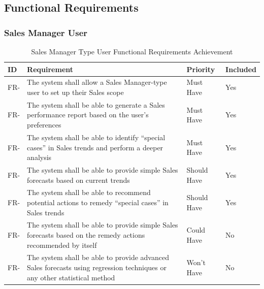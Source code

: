 \documentclass[a4paper]{report}
\begin{document}

\newcommand{\rfrid}{FR-\arabic{ref-frcounter}}
\newcommand{\rnfrid}{NFR-\arabic{ref-nfrcounter}}

\subsection{Functional Requirements}

\subsubsection{Sales Manager User}

\begin{table}[H]
    \centering
    \begin{tabular}{|l|p{8cm}|l|l|}
        \hline
        \textbf{ID} & \textbf{Requirement} & \textbf{Priority} & \textbf{Included} \\
        \hline
        \stepcounter{ref-frcounter}\rfrid & The system shall allow a Sales Manager-type user to set up their Sales scope & Must Have & Yes \\ \hline
        \stepcounter{ref-frcounter}\rfrid & The system shall be able to generate a Sales performance report based on the user’s preferences & Must Have & Yes \\ \hline
        \stepcounter{ref-frcounter}\rfrid & The system shall be able to identify “special cases” in Sales trends and perform a deeper analysis & Must Have & Yes \\ \hline
        \stepcounter{ref-frcounter}\rfrid & The system shall be able to provide simple Sales forecasts based on current trends & Should Have & Yes \\ \hline
        \stepcounter{ref-frcounter}\rfrid & The system shall be able to recommend potential actions to remedy “special cases” in Sales trends & Should Have & Yes \\ \hline
        \stepcounter{ref-frcounter}\rfrid & The system shall be able to provide simple Sales forecasts based on the remedy actions recommended by itself & Could Have & No \\ \hline
        \stepcounter{ref-frcounter}\rfrid & The system shall be able to provide advanced Sales forecasts using regression techniques or any other statistical method & Won’t Have & No \\
        \hline
    \end{tabular}
\caption{Sales Manager Type User Functional Requirements Achievement}
\end{table}
\end{document}
